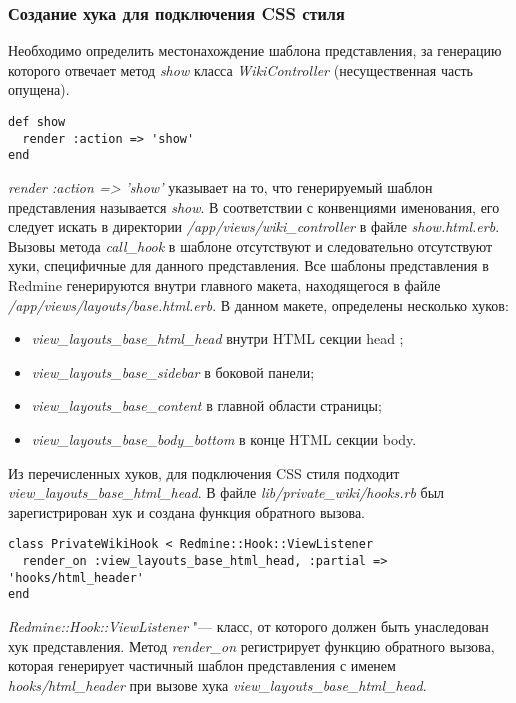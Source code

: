 \subsubsection{Создание хука для подключения CSS стиля}
Необходимо определить местонахождение шаблона представления, за генерацию
которого отвечает метод \textit{show} класса \textit{WikiController}
(несущественная часть опущена).
\small{\begin{lstlisting}
def show
  render :action => 'show'
end
\end{lstlisting}}
\textit{render :action => 'show'} указывает на то, что генерируемый шаблон
представления называется \textit{show}. В соответствии с конвенциями
именования, его следует искать в директории
\textit{/app/views/wiki\_controller} в файле \textit{show.html.erb}.
Вызовы метода \textit{call\_hook} в шаблоне отсутствуют и следовательно
отсутствуют хуки, специфичные для данного представления. Все шаблоны
представления в Redmine генерируются внутри главного макета, находящегося в
файле \textit{/app/views/layouts/base.html.erb}. В данном макете, определены
несколько хуков:
\begin{itemize}
  \item \textit{view\_layouts\_base\_html\_head} внутри HTML секции head ;
  \item \textit{view\_layouts\_base\_sidebar} в боковой панели;
  \item \textit{view\_layouts\_base\_content} в главной области страницы; 
  \item \textit{view\_layouts\_base\_body\_bottom} в конце HTML секции body.
\end{itemize}
Из перечисленных хуков, для подключения CSS стиля подходит
\textit{view\_layouts\_base\_html\_head}. В файле
\textit{lib/private\_wiki/hooks.rb} был зарегистрирован хук и создана функция
обратного вызова.
\small{\begin{lstlisting}
class PrivateWikiHook < Redmine::Hook::ViewListener
  render_on :view_layouts_base_html_head, :partial => 'hooks/html_header'
end
\end{lstlisting}}
\textit{Redmine::Hook::ViewListener} "--- класс, от которого должен быть
унаследован хук представления. Метод \textit{render\_on} регистрирует функцию
обратного вызова, которая генерирует частичный шаблон представления с именем
\textit{hooks/html\_header} при вызове хука
\textit{view\_layouts\_base\_html\_head}.

